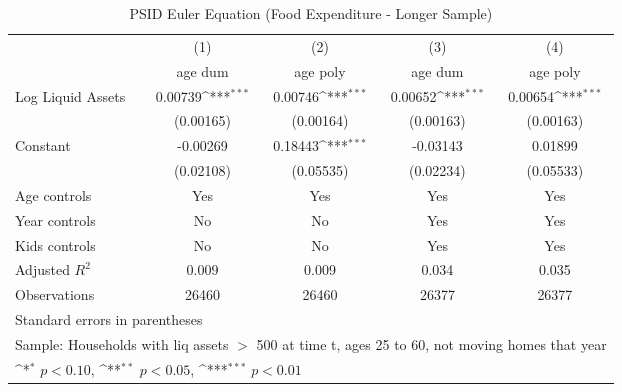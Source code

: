 {
\def\sym#1{\ifmmode^{#1}\else\(^{#1}\)\fi}
\begin{longtable}{l*{4}{c}}
\caption{PSID Euler Equation (Food Expenditure - Longer Sample)}\\
\toprule\endfirsthead\midrule\endhead\midrule\endfoot\endlastfoot
                    &\multicolumn{1}{c}{(1)}&\multicolumn{1}{c}{(2)}&\multicolumn{1}{c}{(3)}&\multicolumn{1}{c}{(4)}\\
                    &\multicolumn{1}{c}{age dum}&\multicolumn{1}{c}{age poly}&\multicolumn{1}{c}{age dum}&\multicolumn{1}{c}{age poly}\\
\midrule
Log Liquid Assets   &     0.00739\sym{***}&     0.00746\sym{***}&     0.00652\sym{***}&     0.00654\sym{***}\\
                    &   (0.00165)         &   (0.00164)         &   (0.00163)         &   (0.00163)         \\
\addlinespace
Constant            &    -0.00269         &     0.18443\sym{***}&    -0.03143         &     0.01899         \\
                    &   (0.02108)         &   (0.05535)         &   (0.02234)         &   (0.05533)         \\
\addlinespace
Age controls        &         Yes         &         Yes         &         Yes         &         Yes         \\
\addlinespace
Year controls       &          No         &          No         &         Yes         &         Yes         \\
\addlinespace
Kids controls       &          No         &          No         &         Yes         &         Yes         \\
\midrule
Adjusted \(R^{2}\)  &       0.009         &       0.009         &       0.034         &       0.035         \\
Observations        &       26460         &       26460         &       26377         &       26377         \\
\bottomrule
\multicolumn{5}{l}{\footnotesize Standard errors in parentheses}\\
\multicolumn{5}{l}{\footnotesize Sample: Households with liq assets $>$ 500 at time t, ages 25 to 60, not moving homes that year}\\
\multicolumn{5}{l}{\footnotesize \sym{*} \(p<0.10\), \sym{**} \(p<0.05\), \sym{***} \(p<0.01\)}\\
\end{longtable}
}

